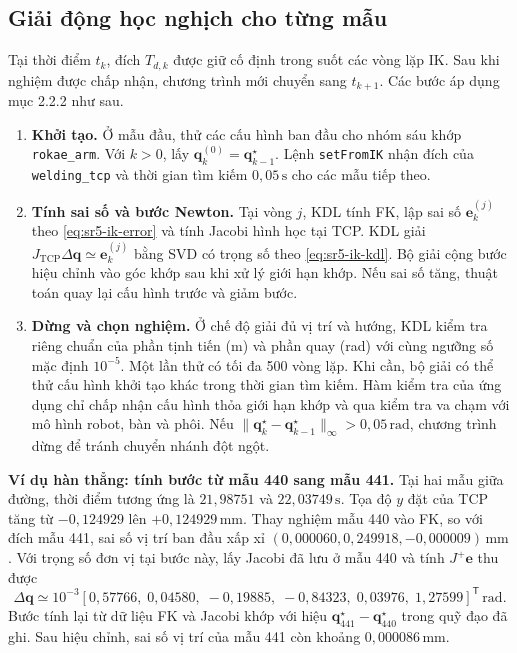 \subsection{Giải động học nghịch cho từng mẫu}
Tại thời điểm \(t_k\), đích \(T_{d,k}\) được giữ cố định trong suốt các vòng lặp IK. Sau khi nghiệm được chấp nhận, chương trình mới chuyển sang \(t_{k+1}\). Các bước áp dụng mục 2.2.2 như sau.
\begin{enumerate}
  \item \textbf{Khởi tạo.} Ở mẫu đầu, thử các cấu hình ban đầu cho nhóm sáu khớp \texttt{rokae\_arm}. Với \(k>0\), lấy \(\mathbf q_k^{(0)}=\mathbf q_{k-1}^{\star}\). Lệnh \texttt{setFromIK} nhận đích của \texttt{welding\_tcp} và thời gian tìm kiếm \(0{,}05\,\mathrm{s}\) cho các mẫu tiếp theo.
  \item \textbf{Tính sai số và bước Newton.} Tại vòng \(j\), KDL tính FK, lập sai số \(\mathbf e_k^{(j)}\) theo \eqref{eq:sr5-ik-error} và tính Jacobi hình học tại TCP. KDL giải \(J_{\mathrm{TCP}}\Delta\mathbf q\simeq\mathbf e_k^{(j)}\) bằng SVD có trọng số theo \eqref{eq:sr5-ik-kdl}. Bộ giải cộng bước hiệu chỉnh vào góc khớp sau khi xử lý giới hạn khớp. Nếu sai số tăng, thuật toán quay lại cấu hình trước và giảm bước.
  \item \textbf{Dừng và chọn nghiệm.} Ở chế độ giải đủ vị trí và hướng, KDL kiểm tra riêng chuẩn của phần tịnh tiến (m) và phần quay (rad) với cùng ngưỡng số mặc định \(10^{-5}\). Một lần thử có tối đa 500 vòng lặp. Khi cần, bộ giải có thể thử cấu hình khởi tạo khác trong thời gian tìm kiếm. Hàm kiểm tra của ứng dụng chỉ chấp nhận cấu hình thỏa giới hạn khớp và qua kiểm tra va chạm với mô hình robot, bàn và phôi. Nếu \(\|\mathbf q_k^\star-\mathbf q_{k-1}^\star\|_\infty>0{,}05\,\mathrm{rad}\), chương trình dừng để tránh chuyển nhánh đột ngột.
\end{enumerate}

\noindent\textbf{Ví dụ hàn thẳng: tính bước từ mẫu 440 sang mẫu 441.}
Tại hai mẫu giữa đường, thời điểm tương ứng là \(21{,}98751\) và \(22{,}03749\,\mathrm{s}\). Tọa độ \(y\) đặt của TCP tăng từ \(-0{,}124929\) lên \(+0{,}124929\,\mathrm{mm}\). Thay nghiệm mẫu 440 vào FK, so với đích mẫu 441, sai số vị trí ban đầu xấp xỉ \((0{,}000060,0{,}249918,-0{,}000009)\,\mathrm{mm}\). Với trọng số đơn vị tại bước này, lấy Jacobi đã lưu ở mẫu 440 và tính \(J^+\mathbf e\) thu được
\[
  \Delta\mathbf q\simeq10^{-3}
    [0{,}57766,\;0{,}04580,\;-0{,}19885,\;-0{,}84323,\;0{,}03976,\;1{,}27599]^{\mathsf T}
    \,\mathrm{rad}.
\]
Bước tính lại từ dữ liệu FK và Jacobi khớp với hiệu \(\mathbf q_{441}^{\star}-\mathbf q_{440}^{\star}\) trong quỹ đạo đã ghi. Sau hiệu chỉnh, sai số vị trí của mẫu 441 còn khoảng \(0{,}000086\,\mathrm{mm}\).

